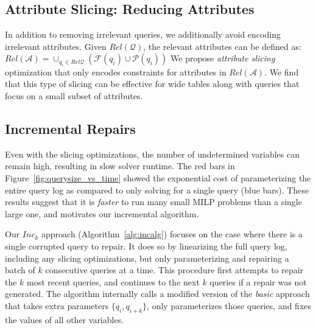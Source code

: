 \subsection{Attribute Slicing: Reducing Attributes}

In addition to removing irrelevant queries, we additionally avoid encoding irrelevant attributes.
Given $Rel\mathcal{(Q)}$, the relevant attributes can be defined as:
$Rel\mathcal{(A)} = \cup_{q_i \in Rel\mathcal{Q}} (\mathcal{F}(q_i)\cup \mathcal{P}(q_i))$
We propose \emph{attribute slicing} optimization that only encodes constraints for attributes in $Rel\mathcal{(A)}$.
We find that this type of slicing can be effective for wide tables along with queries that focus on a small subset of attributes. 




\subsection{Incremental Repairs}\label{sec:incremental}



Even with the slicing optimizations, the number of undetermined variables can remain high, resulting in slow solver runtime.  
The red bars in Figure~\ref{fig:querysize_vs_time} showed the exponential cost of parameterizing the entire query log as compared to only solving for a single query (blue bars).
These results suggest that it is \emph{faster} to run many small MILP problems than a single large one, and motivates our incremental algorithm.

Our \emph{$Inc_k$} approach (Algorithm~\ref{alg:incalg}) focuses on the case where there is a single corrupted query to repair.
It does so by linearizing the full query log, including any slicing optimizations, but only parameterizing and repairing a batch of $k$ consecutive queries at a time. 
This procedure first attempts to repair the $k$ most recent queries, and continues to the next $k$ queries if a repair was not generated.
The algorithm internally calls a modified version of the \emph{basic} approach that takes extra parameters $\{q_i, q_{i+k}\}$, only parameterizes those queries, and fixes the values of all other variables.


